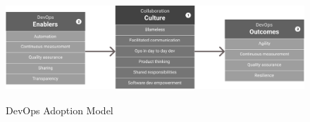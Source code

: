\begin{figure}
  \centering
    \includegraphics[width=14.26cm,height=4cm,natwidth=1116,natheight=313]{model.png}
    \caption{DevOps Adoption Model}
    \label{fig2}
\end{figure}

